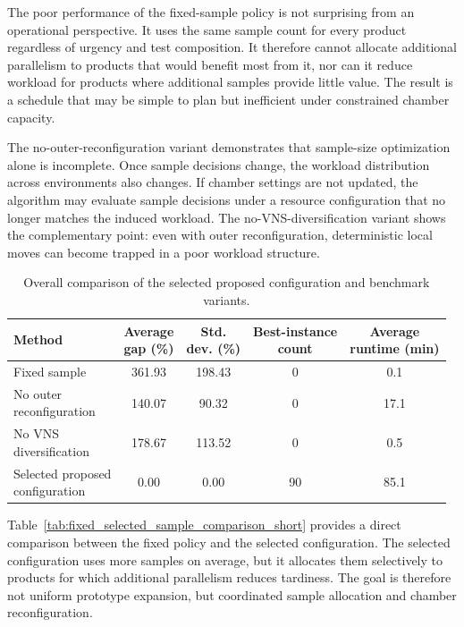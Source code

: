 \documentclass[11pt]{article}
\begin{document}
The poor performance of the fixed-sample policy is not surprising from an operational perspective. It uses the same sample count for every product regardless of urgency and test composition. It therefore cannot allocate additional parallelism to products that would benefit most from it, nor can it reduce workload for products where additional samples provide little value. The result is a schedule that may be simple to plan but inefficient under constrained chamber capacity.

The no-outer-reconfiguration variant demonstrates that sample-size optimization alone is incomplete. Once sample decisions change, the workload distribution across environments also changes. If chamber settings are not updated, the algorithm may evaluate sample decisions under a resource configuration that no longer matches the induced workload. The no-VNS-diversification variant shows the complementary point: even with outer reconfiguration, deterministic local moves can become trapped in a poor workload structure.

\begin{table}[H]
\centering
\caption{Overall comparison of the selected proposed configuration and benchmark variants.}
\label{tab:main_benchmark_comparison_short}
\small
\begin{tabular}{lcccc}
\hline
\textbf{Method}
& \shortstack{\textbf{Average}\\\textbf{gap (\%)}}
& \shortstack{\textbf{Std.}\\\textbf{dev. (\%)}}
& \shortstack{\textbf{Best-instance}\\\textbf{count}}
& \shortstack{\textbf{Average}\\\textbf{runtime (min)}} \\
\hline
Fixed sample & 361.93 & 198.43 & 0 & 0.1 \\
\shortstack[l]{No outer\\reconfiguration} & 140.07 & 90.32 & 0 & 17.1 \\
\shortstack[l]{No VNS\\diversification} & 178.67 & 113.52 & 0 & 0.5 \\
\shortstack[l]{Selected proposed\\configuration} & 0.00 & 0.00 & 90 & 85.1 \\
\hline
\end{tabular}
\end{table}

Table~\ref{tab:fixed_selected_sample_comparison_short} provides a direct comparison between the fixed policy and the selected configuration. The selected configuration uses more samples on average, but it allocates them selectively to products for which additional parallelism reduces tardiness. The goal is therefore not uniform prototype expansion, but coordinated sample allocation and chamber reconfiguration.
\end{document}
